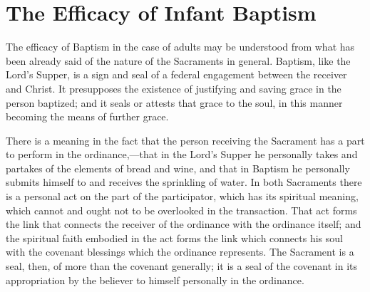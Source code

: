 \documentclass[
]{book}
\begin{document}
\hypertarget{the-efficacy-of-infant-baptism}{%
\section{The Efficacy of Infant Baptism}\label{the-efficacy-of-infant-baptism}}

The efficacy of Baptism in the case of adults may be understood from what has been already said of the nature of the Sacraments in general. Baptism, like the Lord's Supper, is a sign and seal of a federal engagement between the receiver and Christ. It presupposes the existence of justifying and saving grace in the person baptized; and it seals or attests that grace to the soul, in this manner becoming the means of further grace.

There is a meaning in the fact that the person receiving the Sacrament has a part to perform in the ordinance,---that in the Lord's Supper he personally takes and partakes of the elements of bread and wine, and that in Baptism he personally submits himself to and receives the sprinkling of water. In both Sacraments there is a personal act on the part of the participator, which has its spiritual meaning, which cannot and ought not to be overlooked in the transaction. That act forms the link that connects the receiver of the ordinance with the ordinance itself; and the spiritual faith embodied in the act forms the link which connects his soul with the covenant blessings which the ordinance represents. The Sacrament is a seal, then, of more than the covenant generally; it is a seal of the covenant in its appropriation by the believer to himself personally in the ordinance.
\end{document}
